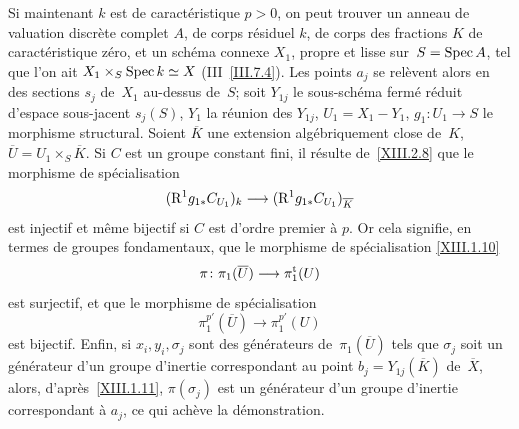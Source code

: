 Si maintenant $k$ est de
caract\'eristique $p>0$, on peut trouver un anneau de valuation
discr\`ete complet $A$, de corps r\'esiduel $k$, de corps des
fractions $K$ de caract\'eristique z\'ero, et un sch\'ema
connexe $X_1$, propre et lisse sur~$S=\operatorname{Spec} A$, tel que l'on ait
$X_1\times_S \operatorname{Spec} k\simeq X$ (III~\ref{III.7.4}). Les points $a_j$ se
rel\`event alors en des sections $s_j$ de~$X_1$ au-dessus de~$S$;
soit $Y_{1j}$ le sous-sch\'ema ferm\'e r\'eduit d'espace
sous-jacent $s_j(S)$, $Y_1$ la r\'eunion des $Y_{1j}$,
$U_1=X_1-Y_1$, $g_1\colon U_1\to S$ le morphisme
structural. Soient $\overline{K}$ une extension alg\'ebriquement
close de~$K$, $\overline{U}= U_1\times_S\overline{K}$. Si $C$ est un
groupe constant fini, il r\'esulte de~\ref{XIII.2.8} que le
morphisme de sp\'ecialisation
$$
(\R^1g_{1*}C_{U_1})_k\to(\R^1g_{1*}C_{U_1})_{\overline{K}}
$$
est injectif et m\^eme bijectif si $C$ est d'ordre premier \`a
$p$. Or cela signifie, en termes de groupes fondamentaux, que le
morphisme de sp\'ecialisation \eqref{XIII.1.10}
$$
\pi \colon \pi_1(\overline{U})\to\pi^{\tame}_1(U)
$$
est surjectif, et que le morphisme de sp\'ecialisation
$$
\pi^{p'}_1(\overline{U})\to\pi^{p'}_1(U)
$$
est bijectif. Enfin, si $x_i, y_i,\sigma_j$ sont des
g\'en\'erateurs de~$\pi_1(\overline{U})$ tels que $\sigma_j$ soit
un g\'en\'erateur d'un groupe d'inertie correspondant au point
$b_j=Y_{1j}(\overline{K})$ de~$\overline{X}$, alors,
d'apr\`es~\ref{XIII.1.11}, $\pi(\sigma_j)$ est un g\'en\'erateur
d'un groupe d'inertie correspondant \`a $a_j$, ce qui ach\`eve la
d\'emonstration.


